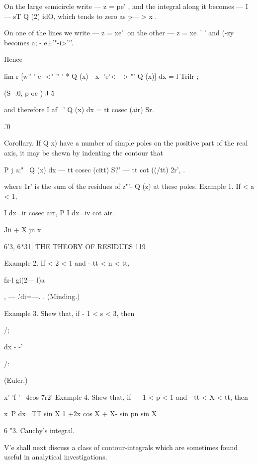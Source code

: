 {On the large semicircle write — z = pe' , and the integral along it
becomes — I — sT Q (2) idO, which tends to zero as p— > x .

On one of the lines we write — z = xe"\ on the other — z = xe~' ' and
(-zy~ becomes a; - e±'"-i>'''.

Hence

lim r [w''-' e- <"-'' ' * Q (x) - x -'e'< - > "' Q (x)] dx = l-Trilr ;

(S- .0, p oc ) J 5

and therefore I af ~' Q (x) dx = tt cosec (air) Sr.

.'0

Corollary. If Q x) have a number of simple poles on the positive part
of the real axis, it may be shewn by indenting the contour that

P j a;"~ Q (x) dx — tt cosec (citt) S?' — tt cot ((/tt) 2r', .

where 1r' is the sum of the residues of z"'- Q (z) at these poles.
Example 1. If < a < 1,

I dx=ir cosec arr, P I dx=iv cot air.

Jii + X jn x



6'3, 6*31] THE THEORY OF RESIDUES 119

Example 2. If < 2 < 1 and - tt < n < tt,



  



fz-l gi(2— l)a

, — .'di=—. . (Minding.)



Example 3. Shew that, if - 1 < s < 3, then



/;



  dx - -'



/:



(Euler.)



   x' 'f ' ~4cos 7r2' Example 4. Shew that, if — 1 < p < 1 and - tt <
X < tt, then

x~P dx \ TT sin X 1 +2x cos X + X- sin pn sin X

6 "3. Cauchy's integral.

 V'e shall next discuss a class of contour-integrals which are
sometimes found useful in analytical investigations.

}
